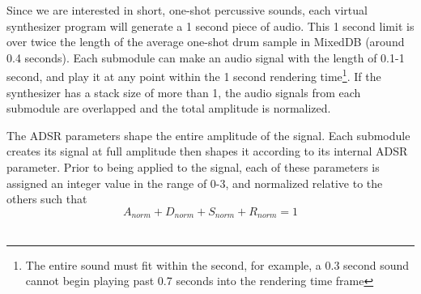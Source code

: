 \documentclass[\main/thesis.tex]{subfiles}
\begin{document}
Since we are interested in short, one-shot percussive sounds, each virtual synthesizer program will generate a 1 second piece of audio. This 1 second limit is over twice the length of the average one-shot drum sample in MixedDB (around 0.4 seconds). Each submodule can make an audio signal with the length of 0.1-1 second, and play it at any point within the 1 second rendering time\footnote{The entire sound must fit within the second, for example, a 0.3 second sound cannot begin playing past 0.7 seconds into the rendering time frame}. If the synthesizer has a stack size of more than 1, the audio signals from each submodule are overlapped and the total amplitude is normalized.

\begin{table}[t!]
\centering
{}
\caption{Synthesizer submodule parameters. Despite the simplicity of the parameters and efforts at constraining the ranges, the number of parameters that can be randomly chosen for each submodule is in the order of $10^{15}$ }
\label{table:submodule_params}
\end{table}
The ADSR parameters shape the entire amplitude of the signal. Each submodule creates its signal at full amplitude then shapes it according to its internal ADSR parameter. Prior to being applied to the signal, each of these parameters is assigned an integer value in the range of 0-3, and normalized relative to the others such that \[ A_{norm} + D_{norm} + S_{norm} + R_{norm} = 1 \] \\ 
\end{document}
